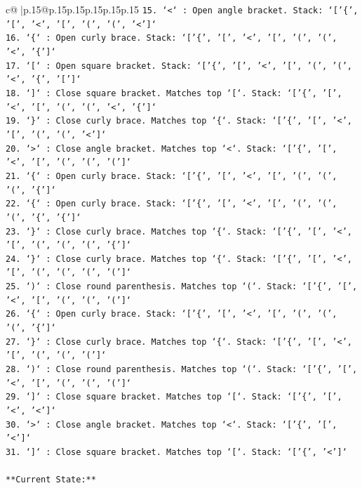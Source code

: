 \documentclass{article}
\begin{document}
{\begin{supertabular}{c@{$\;$}|p{.15\linewidth}@{}p{.15\linewidth}p{.15\linewidth}p{.15\linewidth}p{.15\linewidth}p{.15\linewidth}}
{{{\texttt{15. `<` : Open angle bracket. Stack: `{[}'\{', '{[}', '<', '{[}', '(', '(', '<'{]}`} \\
\texttt{16. `\{` : Open curly brace. Stack: `{[}'\{', '{[}', '<', '{[}', '(', '(', '<', '\{'{]}`} \\
\texttt{17. `{[}` : Open square bracket. Stack: `{[}'\{', '{[}', '<', '{[}', '(', '(', '<', '\{', '{[}'{]}`} \\
\texttt{18. `{]}` : Close square bracket. Matches top `{[}`. Stack: `{[}'\{', '{[}', '<', '{[}', '(', '(', '<', '\{'{]}`} \\
\texttt{19. `\}` : Close curly brace. Matches top `\{`. Stack: `{[}'\{', '{[}', '<', '{[}', '(', '(', '<'{]}`} \\
\texttt{20. `>` : Close angle bracket. Matches top `<`. Stack: `{[}'\{', '{[}', '<', '{[}', '(', '(', '('{]}`} \\
\texttt{21. `\{` : Open curly brace. Stack: `{[}'\{', '{[}', '<', '{[}', '(', '(', '(', '\{'{]}`} \\
\texttt{22. `\{` : Open curly brace. Stack: `{[}'\{', '{[}', '<', '{[}', '(', '(', '(', '\{', '\{'{]}`} \\
\texttt{23. `\}` : Close curly brace. Matches top `\{`. Stack: `{[}'\{', '{[}', '<', '{[}', '(', '(', '(', '\{'{]}`} \\
\texttt{24. `\}` : Close curly brace. Matches top `\{`. Stack: `{[}'\{', '{[}', '<', '{[}', '(', '(', '(', '('{]}`} \\
\texttt{25. `)` : Close round parenthesis. Matches top `(`. Stack: `{[}'\{', '{[}', '<', '{[}', '(', '(', '('{]}`} \\
\texttt{26. `\{` : Open curly brace. Stack: `{[}'\{', '{[}', '<', '{[}', '(', '(', '(', '\{'{]}`} \\
\texttt{27. `\}` : Close curly brace. Matches top `\{`. Stack: `{[}'\{', '{[}', '<', '{[}', '(', '(', '('{]}`} \\
\texttt{28. `)` : Close round parenthesis. Matches top `(`. Stack: `{[}'\{', '{[}', '<', '{[}', '(', '(', '('{]}`} \\
\texttt{29. `{]}` : Close square bracket. Matches top `{[}`. Stack: `{[}'\{', '{[}', '<', '<'{]}`} \\
\texttt{30. `>` : Close angle bracket. Matches top `<`. Stack: `{[}'\{', '{[}', '<'{]}`} \\
\texttt{31. `{]}` : Close square bracket. Matches top `{[}`. Stack: `{[}'\{', '<'{]}`} \\
\\ 
\texttt{**Current State:**} \\
}}}
\end{supertabular}}
\end{document}
